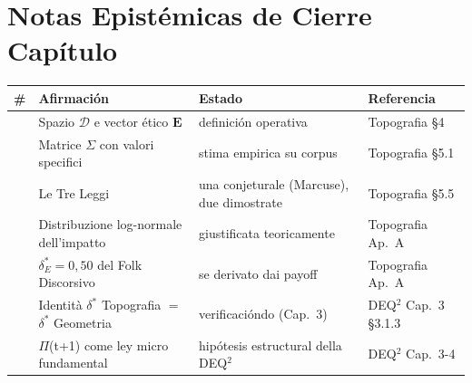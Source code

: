 \section{Notas Epistémicas de Cierre
Capítulo}\label{note-epistemiche-di-chiusura-capítulo}

{\def\LTcaptype{none} %
{\small\begin{longtable}[]{@{}
  >{\raggedright\arraybackslash}p{}
  >{\raggedright\arraybackslash}p{}
  >{\raggedright\arraybackslash}p{}
  >{\raggedright\arraybackslash}p{}@{}}
\toprule\noalign{}
\begin{minipage}[b]{\linewidth}\raggedright
\#
\end{minipage} & \begin{minipage}[b]{\linewidth}\raggedright
Afirmación
\end{minipage} & \begin{minipage}[b]{\linewidth}\raggedright
Estado
\end{minipage} & \begin{minipage}[b]{\linewidth}\raggedright
Referencia
\end{minipage} \\
\midrule\noalign{}
\endhead
\bottomrule\noalign{}
\endlastfoot
1 & Spazio \(\mathcal{D}\) e vector ético \(\mathbf{E}\) & \Proved{}
definición operativa & Topografia \S{}4 \\
2 & Matrice \(\Sigma\) con valori specifici & \Proved{} stima empirica
su corpus & Topografia \S{}5.1 \\
3 & Le Tre Leggi & \Proved{} una conjeturale (Marcuse), due dimostrate
& Topografia \S{}5.5 \\
4 & Distribuzione log-normale dell'impatto & \Proved{} giustificata
teoricamente & Topografia Ap.~A \\
5 & \(\delta^*_E = 0{,}50\) del Folk Discorsivo & \Proved{} se derivato dai
payoff & Topografia Ap.~A \\
6 & Identità \(\delta^*\) Topografia \(=\) \(\delta^*\) Geometria &
\Proved{} verificacióndo (Cap.~3) & DEQ$^2$ Cap.~3 \S{}3.1.3 \\
7 & $\Pi$(t+1) come ley micro fundamental & \Hypoth{} hipótesis estructural
della DEQ$^2$ & DEQ$^2$ Cap.~3-4 \\
\end{longtable}}
}


